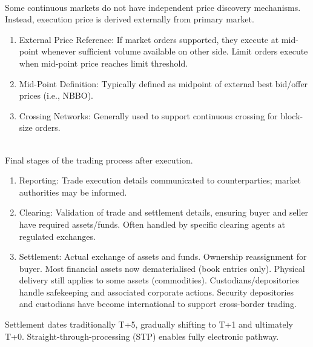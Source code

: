 \begin{remark} \\
Some continuous markets do not have independent price discovery mechanisms. Instead, execution price is derived externally from primary market.
\begin{enumerate}[label=\roman*.]
\setlength{\itemsep}{0pt}
\item External Price Reference: If market orders supported, they execute at mid-point whenever sufficient volume available on other side. Limit orders execute when mid-point price reaches limit threshold.
\item Mid-Point Definition: Typically defined as midpoint of external best bid/offer prices (i.e., NBBO).
\item Crossing Networks: Generally used to support continuous crossing for block-size orders.
\end{enumerate}
\end{remark}

\begin{definition} \\
Final stages of the trading process after execution.
\begin{enumerate}[label=\roman*.]
\setlength{\itemsep}{0pt}
\item Reporting: Trade execution details communicated to counterparties; market authorities may be informed.
\item Clearing: Validation of trade and settlement details, ensuring buyer and seller have required assets/funds. Often handled by specific clearing agents at regulated exchanges.
\item Settlement: Actual exchange of assets and funds. Ownership reassignment for buyer. Most financial assets now dematerialised (book entries only). Physical delivery still applies to some assets (commodities). Custodians/depositories handle safekeeping and associated corporate actions. Security depositories and custodians have become international to support cross-border trading.
\end{enumerate}
Settlement dates traditionally T+5, gradually shifting to T+1 and ultimately T+0. Straight-through-processing (STP) enables fully electronic pathway.
\end{definition}

